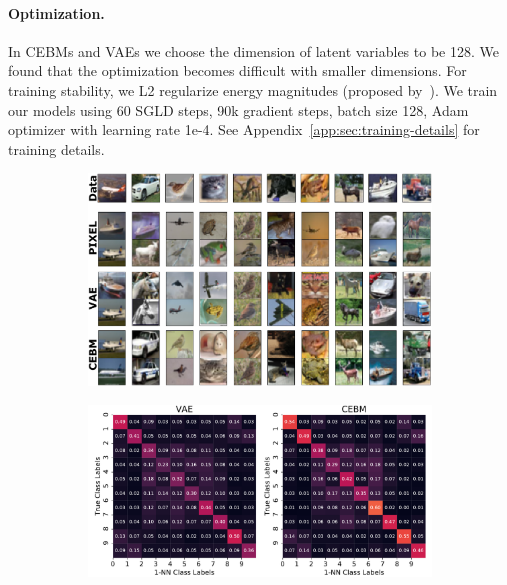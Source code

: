 \documentclass{article}
\begin{document}
\paragraph{Optimization.} In CEBMs and VAEs we choose the dimension of latent variables to be 128. We found that the optimization becomes difficult with smaller dimensions. For training stability, we L2 regularize energy magnitudes (proposed by~\citet{du2019implicit}). We train our models using 60 SGLD steps, 90k gradient steps, batch size 128, Adam optimizer with learning rate 1e-4. See Appendix~\ref{app:sec:training-details} for training details.

\begin{figure}[!t]
\centering
\begin{subfigure}{0.42\textwidth}
\centering
\includegraphics[width=\linewidth]{figures/overview_figure.pdf}
\end{subfigure}
\begin{subfigure}{0.45\textwidth}
\centering
\includegraphics[width=\linewidth]{figures/confusion_matrix_22row_cifar10.pdf}

\end{subfigure}
\end{figure}
\end{document}
